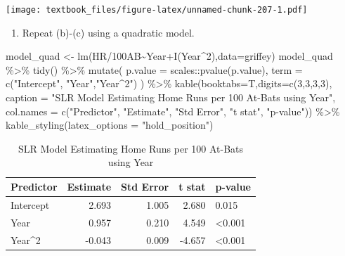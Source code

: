 \documentclass[
  11pt,
]{book}
\newenvironment{Shaded}{\begin{snugshade}}{\end{snugshade}}
\newcommand{\AttributeTok}[1]{\textcolor[rgb]{0.77,0.63,0.00}{#1}}
\newcommand{\DecValTok}[1]{\textcolor[rgb]{0.00,0.00,0.81}{#1}}
\newcommand{\FunctionTok}[1]{\textcolor[rgb]{0.00,0.00,0.00}{#1}}
\newcommand{\NormalTok}[1]{#1}
\newcommand{\OtherTok}[1]{\textcolor[rgb]{0.56,0.35,0.01}{#1}}
\newcommand{\SpecialCharTok}[1]{\textcolor[rgb]{0.00,0.00,0.00}{#1}}
\newcommand{\StringTok}[1]{\textcolor[rgb]{0.31,0.60,0.02}{#1}}
\providecommand{\tightlist}{%
  \setlength{\itemsep}{0pt}\setlength{\parskip}{0pt}}
\theoremstyle{definition}
\theoremstyle{definition}
\theoremstyle{definition}
\theoremstyle{definition}
\theoremstyle{remark}
\begin{document}
\texttt{[image: textbook\_files/figure-latex/unnamed-chunk-207-1.pdf]}

\newpage

\begin{enumerate}
\def\labelenumi{(\alph{enumi})}
\setcounter{enumi}{4}
\tightlist
\item
  Repeat (b)-(c) using a quadratic model.
\end{enumerate}

\begin{Shaded}
\begin{Highlighting}[]
\NormalTok{model\_quad }\OtherTok{\textless{}{-}} \FunctionTok{lm}\NormalTok{(}\StringTok{\textasciigrave{}}\AttributeTok{HR/100AB}\StringTok{\textasciigrave{}}\SpecialCharTok{\textasciitilde{}}\NormalTok{Year}\SpecialCharTok{+}\FunctionTok{I}\NormalTok{(Year}\SpecialCharTok{\^{}}\DecValTok{2}\NormalTok{),}\AttributeTok{data=}\NormalTok{griffey)}
\NormalTok{model\_quad }\SpecialCharTok{\%\textgreater{}\%} \FunctionTok{tidy}\NormalTok{() }\SpecialCharTok{\%\textgreater{}\%}
  \FunctionTok{mutate}\NormalTok{(}
    \AttributeTok{p.value =}\NormalTok{ scales}\SpecialCharTok{::}\FunctionTok{pvalue}\NormalTok{(p.value),}
    \AttributeTok{term =} \FunctionTok{c}\NormalTok{(}\StringTok{"Intercept"}\NormalTok{, }\StringTok{"Year"}\NormalTok{,}\StringTok{"Year\^{}2"}\NormalTok{)}
\NormalTok{  ) }\SpecialCharTok{\%\textgreater{}\%}
  \FunctionTok{kable}\NormalTok{(}\AttributeTok{booktabs=}\NormalTok{T,}\AttributeTok{digits=}\FunctionTok{c}\NormalTok{(}\DecValTok{3}\NormalTok{,}\DecValTok{3}\NormalTok{,}\DecValTok{3}\NormalTok{,}\DecValTok{3}\NormalTok{), }
        \AttributeTok{caption =} \StringTok{"SLR Model Estimating Home Runs per 100 At{-}Bats using Year"}\NormalTok{,}
        \AttributeTok{col.names =} \FunctionTok{c}\NormalTok{(}\StringTok{"Predictor"}\NormalTok{, }\StringTok{"Estimate"}\NormalTok{, }\StringTok{"Std Error"}\NormalTok{, }\StringTok{"t stat"}\NormalTok{, }\StringTok{"p{-}value"}\NormalTok{)) }\SpecialCharTok{\%\textgreater{}\%}
  \FunctionTok{kable\_styling}\NormalTok{(}\AttributeTok{latex\_options =} \StringTok{"hold\_position"}\NormalTok{)}
\end{Highlighting}
\end{Shaded}

\begin{table}[!h]

\caption{\label{tab:unnamed-chunk-208}SLR Model Estimating Home Runs per 100 At-Bats using Year}
\centering
\begin{tabular}[t]{lrrrl}
\toprule
Predictor & Estimate & Std Error & t stat & p-value\\
\midrule
Intercept & 2.693 & 1.005 & 2.680 & 0.015\\
Year & 0.957 & 0.210 & 4.549 & <0.001\\
Year\textasciicircum{}2 & -0.043 & 0.009 & -4.657 & <0.001\\
\bottomrule
\end{tabular}
\end{table}
\end{document}
